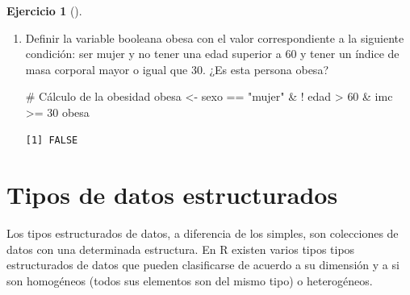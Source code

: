 \documentclass[
  spanish,
  a4paper,
]{scrreport}
\newenvironment{Shaded}{\begin{snugshade}}{\end{snugshade}}
\newcommand{\CommentTok}[1]{\textcolor[rgb]{0.37,0.37,0.37}{#1}}
\newcommand{\DecValTok}[1]{\textcolor[rgb]{0.68,0.00,0.00}{#1}}
\newcommand{\NormalTok}[1]{\textcolor[rgb]{0.00,0.23,0.31}{#1}}
\newcommand{\OtherTok}[1]{\textcolor[rgb]{0.00,0.23,0.31}{#1}}
\newcommand{\SpecialCharTok}[1]{\textcolor[rgb]{0.37,0.37,0.37}{#1}}
\newcommand{\StringTok}[1]{\textcolor[rgb]{0.13,0.47,0.30}{#1}}
\theoremstyle{definition}
\newtheorem{exercise}{Ejercicio}[chapter]
\theoremstyle{definition}
\theoremstyle{remark}
\begin{document}
\begin{exercise}[]
\begin{enumerate}
\begin{tcolorbox}
\begin{verbatim}
[1] "Índice de masa corporal:  22.04 KG/M²"
\end{verbatim}

  \end{tcolorbox}
\item
  Definir la variable booleana obesa con el valor correspondiente a la
  siguiente condición: ser mujer y no tener una edad superior a 60 y
  tener un índice de masa corporal mayor o igual que 30. ¿Es esta
  persona obesa?

  \begin{tcolorbox}[enhanced jigsaw, arc=.35mm, bottomrule=.15mm, bottomtitle=1mm, breakable, colback=white, colbacktitle=quarto-callout-note-color!10!white, colframe=quarto-callout-note-color-frame, coltitle=black, left=2mm, leftrule=.75mm, opacityback=0, opacitybacktitle=0.6, rightrule=.15mm, title=\textcolor{quarto-callout-note-color}{\faInfo}\hspace{0.5em}{Solución}, titlerule=0mm, toprule=.15mm, toptitle=1mm]

\begin{Shaded}
\begin{Highlighting}[]
\CommentTok{\# Cálculo de la obesidad}
\NormalTok{obesa }\OtherTok{\textless{}{-}}\NormalTok{ sexo }\SpecialCharTok{==} \StringTok{"mujer"} \SpecialCharTok{\&} \SpecialCharTok{!}\NormalTok{ edad }\SpecialCharTok{\textgreater{}} \DecValTok{60} \SpecialCharTok{\&}\NormalTok{ imc }\SpecialCharTok{\textgreater{}=} \DecValTok{30}
\NormalTok{obesa}
\end{Highlighting}
\end{Shaded}

\begin{verbatim}
[1] FALSE
\end{verbatim}

  \end{tcolorbox}
\end{enumerate}

\end{exercise}


\chapter{Tipos de datos
estructurados}\label{tipos-de-datos-estructurados}

Los tipos estructurados de datos, a diferencia de los simples, son
colecciones de datos con una determinada estructura. En R existen varios
tipos tipos estructurados de datos que pueden clasificarse de acuerdo a
su dimensión y a si son homogéneos (todos sus elementos son del mismo
tipo) o heterogéneos.
\end{document}
